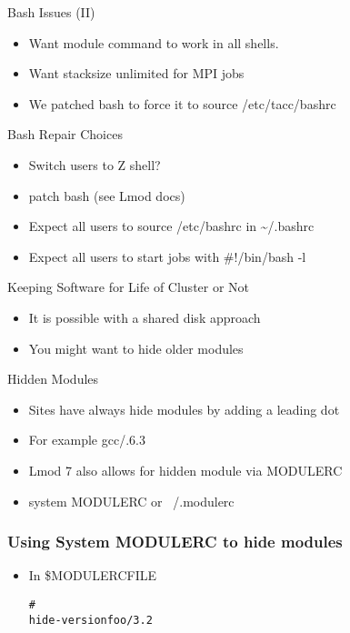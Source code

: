 \documentclass[dvipsnames,aspectratio=169]{beamer}
\begin{document}
\begin{frame}{Bash Issues (II)}
  \begin{itemize}
    \item Want module command to work in all shells.
    \item Want stacksize unlimited for MPI jobs
    \item We patched bash to force it to source /etc/tacc/bashrc
  \end{itemize}
\end{frame}

\begin{frame}{Bash Repair Choices}
  \begin{itemize}
    \item Switch users to Z shell?
    \item patch bash (see Lmod docs)
    \item Expect all users to source /etc/bashrc in \textasciitilde/.bashrc
    \item Expect all users to start jobs with \#!/bin/bash -l
  \end{itemize}
\end{frame}

\begin{frame}{Keeping Software for Life of Cluster or Not}
  \begin{itemize}
    \item It is possible with a shared disk approach
    \item You might want to hide older modules
  \end{itemize}
\end{frame}

\begin{frame}{Hidden Modules}
  \begin{itemize}
    \item Sites have always hide modules by adding a leading dot
    \item For example gcc/.6.3
    \item Lmod 7 also allows for hidden module via MODULERC
    \item system MODULERC or ~/.modulerc
  \end{itemize}
\end{frame}

\begin{frame}[fragile]
    \frametitle{Using System MODULERC to hide modules}
  \begin{itemize}
    \item In \$MODULERCFILE
  {\small
    \begin{alltt}
        #%Module
        hide-version foo/3.2
    \end{alltt}
}
  \end{itemize}
\end{frame}
\end{document}
